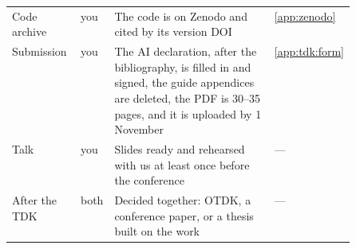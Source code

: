 {\begin{xltabular}{\linewidth}{>{\raggedright\arraybackslash}p{0.2\linewidth} >{\raggedright\arraybackslash}p{0.09\linewidth} >{\raggedright\arraybackslash}X >{\raggedright\arraybackslash}p{0.21\linewidth}}
  Code archive & you & The code is on Zenodo and cited by its version DOI & \cref{app:zenodo} \\
  Submission & you & The AI declaration, after the bibliography, is filled in and signed, the guide appendices are deleted, the PDF is 30--35 pages, and it is uploaded by 1 November & \cref{app:tdk:form} \\
  Talk & you & Slides ready and rehearsed with us at least once before the conference & --- \\
  After the TDK & both & Decided together: OTDK, a conference paper, or a thesis built on the work & --- \\
\end{xltabular}
}
